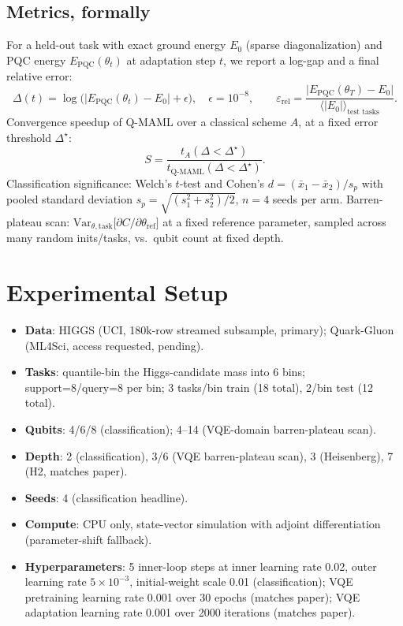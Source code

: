 \documentclass[11pt]{article}
\begin{document}
\subsection{Metrics, formally}
\label{sec:metrics}
For a held-out task with exact ground energy $E_0$ (sparse diagonalization) and PQC energy
$E_{\mathrm{PQC}}(\theta_t)$ at adaptation step $t$, we report a log-gap and a final relative error:
\begin{equation}
\Delta(t) = \log\!\Big(\big|E_{\mathrm{PQC}}(\theta_t) - E_0\big| + \epsilon\Big), \quad \epsilon=10^{-8},
\qquad
\varepsilon_{\mathrm{rel}} = \frac{\big|E_{\mathrm{PQC}}(\theta_T) - E_0\big|}{\big\langle |E_0| \big\rangle_{\text{test tasks}}}.
\label{eq:metrics}
\end{equation}
Convergence speedup of Q-MAML over a classical scheme $A$, at a fixed error threshold $\Delta^\star$:
\begin{equation}
S = \frac{t_A(\Delta<\Delta^\star)}{t_{\text{Q-MAML}}(\Delta<\Delta^\star)}.
\label{eq:speedup}
\end{equation}
Classification significance: Welch's $t$-test and Cohen's $d=(\bar x_1-\bar x_2)/s_p$ with pooled standard
deviation $s_p=\sqrt{(s_1^2+s_2^2)/2}$, $n=4$ seeds per arm. Barren-plateau scan:
$\mathrm{Var}_{\theta,\text{task}}\!\big[\partial C/\partial\theta_{\mathrm{ref}}\big]$ at a fixed reference
parameter, sampled across many random inits/tasks, vs.\ qubit count at fixed depth.

\section{Experimental Setup}
\label{sec:setup}

\begin{itemize}[nosep]
    \item \textbf{Data}: HIGGS (UCI, 180k-row streamed subsample, primary); Quark-Gluon (ML4Sci, access
    requested, pending).
    \item \textbf{Tasks}: quantile-bin the Higgs-candidate mass into 6 bins; support=8/query=8 per bin; 3
    tasks/bin train (18 total), 2/bin test (12 total).
    \item \textbf{Qubits}: 4/6/8 (classification); 4--14 (VQE-domain barren-plateau scan).
    \item \textbf{Depth}: 2 (classification), 3/6 (VQE barren-plateau scan), 3 (Heisenberg), 7 (H2, matches
    paper).
    \item \textbf{Seeds}: 4 (classification headline).
    \item \textbf{Compute}: CPU only, state-vector simulation with adjoint differentiation (parameter-shift
    fallback).
    \item \textbf{Hyperparameters}: 5 inner-loop steps at inner learning rate 0.02, outer learning rate
    $5\times10^{-3}$, initial-weight scale 0.01 (classification); VQE pretraining learning rate 0.001 over 30
    epochs (matches paper); VQE adaptation learning rate 0.001 over 2000 iterations (matches paper).
\end{itemize}
\end{document}

